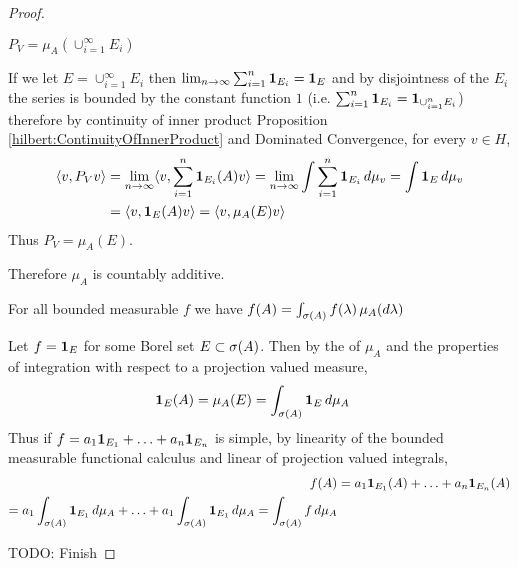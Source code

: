 \begin{proof}
\begin{clm} $P_V = \mu_A(\cup_{i=1}^\infty E_i)$
\end{clm}
If we let $E = \cup_{i=1}^\infty E_i$ then $\lim_{n \to \infty} \sum_{i=1}^n \textbf{1}_{E_i} = \textbf{1}_{E}$ and by disjointness of the $E_i$ the series is bounded by the constant function $1$ (i.e. $\sum_{i=1}^n \textbf{1}_{E_i}  = \textbf{1}_{\cup_{i=1}^n E_i}$) therefore by continuity of inner product Proposition \ref{hilbert:ContinuityOfInnerProduct} and Dominated Convergence, for every $v \in H$,
\begin{align*}
\langle v, P_V v \rangle &= \lim_{n \to \infty} \langle v, \sum_{i=1}^n \textbf{1}_{E_i}(A) v \rangle = \lim_{n \to \infty} \int \sum_{i=1}^n \textbf{1}_{E_i} \, d\mu_v = \int \textbf{1}_{E} \, d\mu_v \\
&= \langle v, \textbf{1}_{E}(A) v \rangle = \langle v, \mu_A(E) v \rangle 
\end{align*}
Thus $P_V = \mu_A(E)$.

Therefore $\mu_A$ is countably additive.  

\begin{clm} For all bounded measurable $f$ we have $f(A) = \int_{\sigma(A)} f(\lambda)  \, \mu_A(d\lambda)$
\end{clm}
Let $f = \textbf{1}_{E}$ for some Borel set $E \subset \sigma(A)$.  Then by the of $\mu_A$ and the properties of
integration with respect to a projection valued measure,
\begin{align*}
\textbf{1}_{E}(A) &= \mu_A(E) = \int_{\sigma(A)} \textbf{1}_{E} \, d\mu_A
\end{align*}
Thus if  $f = a_1 \textbf{1}_{E_1} + \dotsc +  a_n \textbf{1}_{E_n}$ is simple, by linearity of the bounded measurable 
functional calculus and linear of projection valued integrals,
\begin{align*}
f(A) &= a_1 \textbf{1}_{E_1}(A) + \dotsc +  a_n \textbf{1}_{E_n}(A) \\
= a_1 \int_{\sigma(A)} \textbf{1}_{E_1} \, d\mu_A + \dotsc + a_1 \int_{\sigma(A)} \textbf{1}_{E_1} \, d\mu_A = \int_{\sigma(A)} f \, d\mu_A
\end{align*}

TODO: Finish
\end{proof}

